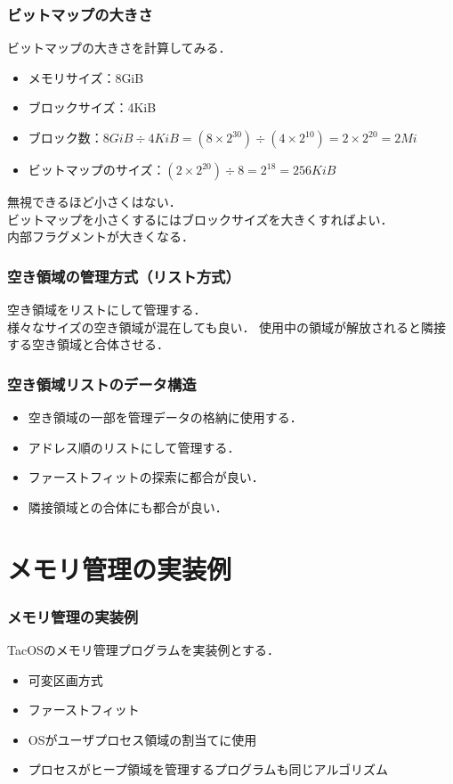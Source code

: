\documentclass[unicode,handout]{beamer}                   %
\begin{document}
\begin{frame}
  \frametitle{ビットマップの大きさ}
  ビットマップの大きさを計算してみる．
  \begin{itemize}
  \item メモリサイズ：8GiB
  \item ブロックサイズ：4KiB
  \item ブロック数：$8GiB \div 4KiB = (8\times 2^{30}) \div (4 \times 2^{10})
    = 2 \times 2^{20} = 2Mi$
  \item ビットマップのサイズ：$(2 \times 2^{20}) \div 8 = 2^{18} = 256KiB$
  \end{itemize}
  無視できるほど小さくはない．\\
  ビットマップを小さくするにはブロックサイズを大きくすればよい．\\
  内部フラグメントが大きくなる．
\end{frame}

\begin{frame}
  \frametitle{空き領域の管理方式（リスト方式）}
  空き領域をリストにして管理する．\\
  様々なサイズの空き領域が混在しても良い．
  \vfill
  \vfill
  使用中の領域が解放されると隣接する空き領域と合体させる．
\end{frame}

\begin{frame}
  \frametitle{空き領域リストのデータ構造}
  \begin{itemize}
    \item 空き領域の一部を管理データの格納に使用する．
    \item アドレス順のリストにして管理する．
    \item ファーストフィットの探索に都合が良い．
    \item 隣接領域との合体にも都合が良い．
  \end{itemize}
\end{frame}

\section{メモリ管理の実装例}
\begin{frame}
  \frametitle{メモリ管理の実装例}
  TacOSのメモリ管理プログラムを実装例とする．
  \begin{itemize}
  \item 可変区画方式
  \item ファーストフィット
  \item OSがユーザプロセス領域の割当てに使用
  \item プロセスがヒープ領域を管理するプログラムも同じアルゴリズム
  \end{itemize}
\end{frame}
\end{document}
